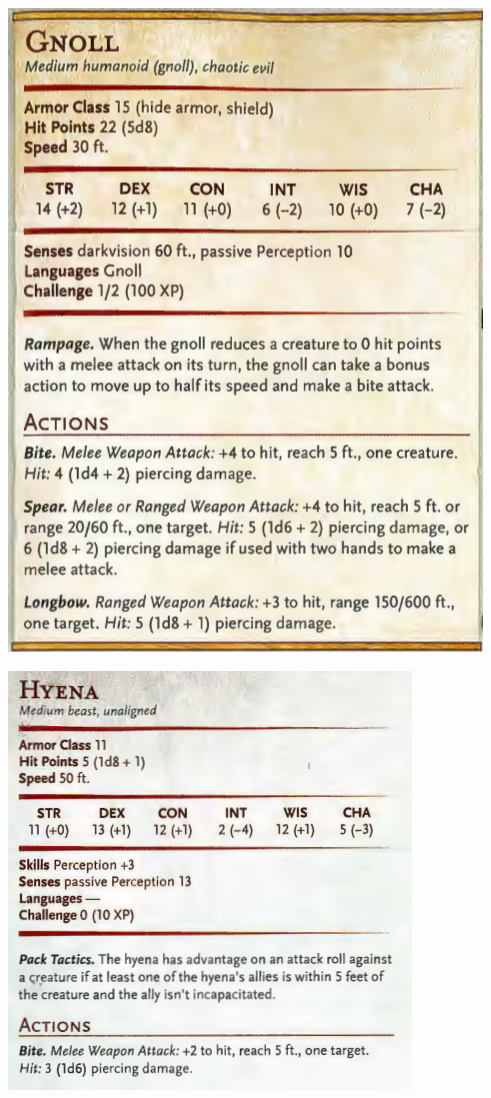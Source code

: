 \begin{multicols}{2}
\columnbreak

\includegraphics[width=\linewidth,keepaspectratio]{img/statblock/gnoll.png}

\includegraphics[width=\linewidth,keepaspectratio]{img/statblock/hyena.png}
\end{multicols}

